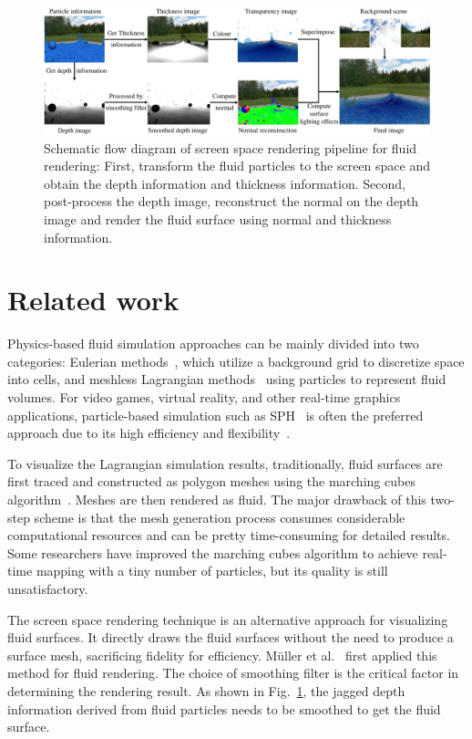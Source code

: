 \documentclass[times,twocolumn,final]{elsarticle}
\begin{document}
\begin{figure}
    \includegraphics[width=\linewidth]{figs/figure2_b.pdf}
    \caption{Schematic flow diagram of screen space rendering pipeline for fluid rendering: First, transform the fluid particles to the screen space and obtain the depth information and thickness information. Second, post-process the depth image, reconstruct the normal on the depth image and render the fluid surface using normal and thickness information.}
    \label{fig:figure2}
\end{figure}

\section{Related work}
Physics-based fluid simulation approaches can be mainly divided into two categories: Eulerian methods~\cite{ref:ref4}, which utilize a background grid to discretize space into cells, and meshless Lagrangian methods~\cite{ref:ref7} using particles to represent fluid volumes. For video games, virtual reality, and other real-time graphics applications, particle-based simulation such as SPH~\cite{IISPH2013,DFSPH2015,ref:ref5} is often the preferred approach due to its high efficiency and flexibility~\cite{carensac2022optimizations}. 

To visualize the Lagrangian simulation results, traditionally, fluid surfaces are first traced and constructed as polygon meshes using the marching cubes algorithm~\cite{ref:ref12,ref:ref6,yang2020completely}. Meshes are then rendered as fluid. The major drawback of this two-step scheme is that the mesh generation process consumes considerable computational resources and can be pretty time-consuming for detailed results. Some researchers have improved the marching cubes algorithm to achieve real-time mapping with a tiny number of particles, but its quality is still unsatisfactory\cite{ref:ref10}.

The screen space rendering technique is an alternative approach for visualizing fluid surfaces. It directly draws the fluid surfaces without the need to produce a surface mesh, sacrificing fidelity for efficiency. M{\"u}ller et al.~\cite{ref:ref2} first applied this method for fluid rendering. The choice of smoothing filter is the critical factor in determining the rendering result. As shown in Fig.~\ref{fig:figure2}, the jagged depth information derived from fluid particles needs to be smoothed to get the fluid surface. 
\end{document}
